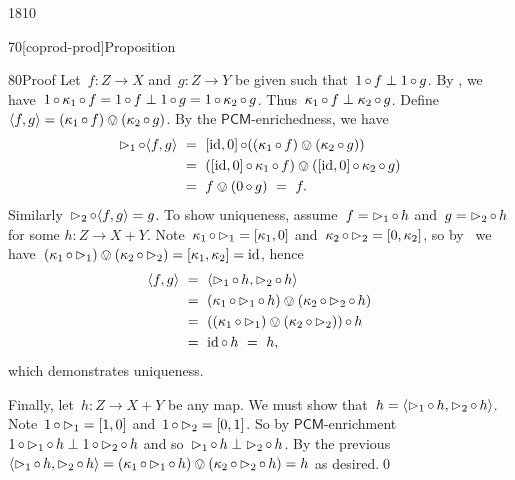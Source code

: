 \begin{parsec}{1810}
\begin{point}{70}[coprod-prod]{Proposition}
\begin{point}{80}{Proof}
Let~$f\colon Z \to X$ and~$g\colon Z \to Y$ be given
        such that~$1\mathop{\circ} f \perp 1\mathop{\circ} g$.
By ,
we have~$1 \mathop{\circ} \kappa_1 \mathop{\circ} f = 1 \mathop{\circ} f \perp 1 \mathop{\circ} g =
        1 \mathop{\circ} \kappa_2 \mathop{\circ} g$.
Thus~$\kappa_1 \mathop{\circ} f \perp \kappa_2 \mathop{\circ} g$.
Define~$\langle f, g\rangle = (\kappa_1 \mathop{\circ} f) \ovee (\kappa_2 \mathop{\circ} g)$.
    By the $\mathsf{PCM}$-enrichedness, we have
\begin{align*}
\mathord{\vartriangleright}_1 \mathop{\circ} \langle f, g\rangle 
&\  =\  [\mathrm{id}, 0] \mathop{\circ} ((\kappa_1 \mathop{\circ} f) \ovee (\kappa_2 \mathop{\circ} g)) \\
 &\  =\  ([\mathrm{id}, 0] \mathop{\circ} \kappa_1 \mathop{\circ} f) \ovee 
    ([\mathrm{id}, 0] \mathop{\circ} \kappa_2 \mathop{\circ} g) \\
    & \ =\  f \ovee (0 \mathop{\circ} g) \ = \ f.
\end{align*}
Similarly~$\mathord{\vartriangleright}_2 \mathop{\circ} \langle f, g \rangle = g$.
To show uniqueness, assume~$f = \mathord{\vartriangleright}_1 \mathop{\circ} h$
    and~$g = \mathord{\vartriangleright}_2 \mathop{\circ} h$ for some
    $h\colon Z \to X+Y$.
Note~$\kappa_1 \mathop{\circ} \mathord{\vartriangleright}_1 = [\kappa_1, 0]$
and~$\kappa_2 \mathop{\circ} \mathord{\vartriangleright}_2 = [0, \kappa_2]$,
so by~ we have~$(\kappa_1 \mathop{\circ} \mathord{\vartriangleright}_1)
    \ovee (\kappa_2 \mathop{\circ} \mathord{\vartriangleright}_2) = [\kappa_1, \kappa_2] = \mathrm{id}$,
    hence
\begin{align*}
    \langle f, g\rangle & \ = \ 
    \langle \pproj_1 \after h, \pproj_2 \after h \rangle \\
    & \ = \ (\kappa_1 \after\pproj_1 \after h) 
    \ovee (\kappa_2 \after\pproj_2 \after h)  \\
    & \ = \ ((\kappa_1 \after\pproj_1 )
    \ovee (\kappa_2 \after\pproj_2 ))  \after h \\
    & \ = \   \id \after h \ = \  h,
\end{align*}
which demonstrates uniqueness.

Finally, let~$h\colon Z\to X+Y$ be any map.
We must show that~$h = \langle \mathord{\vartriangleright}_1 \mathop{\circ} h, \mathord{\vartriangleright}_2 \mathop{\circ} h\rangle$.
Note~$1 \mathop{\circ} \mathord{\vartriangleright}_1 = [1,0]$
    and~$1 \mathop{\circ} \mathord{\vartriangleright}_2 = [0,1]$.
    So by $\mathsf{PCM}$-enrichment~$1 \mathop{\circ} \mathord{\vartriangleright}_1 \mathop{\circ} h \perp 1 \mathop{\circ} \mathord{\vartriangleright}_2 \mathop{\circ} h$ and so~$\mathord{\vartriangleright}_1 \mathop{\circ} h \perp \mathord{\vartriangleright}_2 \mathop{\circ} h$.
By the previous
$\langle \mathord{\vartriangleright}_1 \mathop{\circ} h, \mathord{\vartriangleright}_2 \mathop{\circ} h\rangle
= (\kappa_1 \mathop{\circ} \mathord{\vartriangleright}_1 \mathop{\circ} h) \ovee
 (\kappa_2 \mathop{\circ} \mathord{\vartriangleright}_2 \mathop{\circ} h) 
 = h $ as desired.\qed
\end{point}
\end{point}


\end{parsec}

